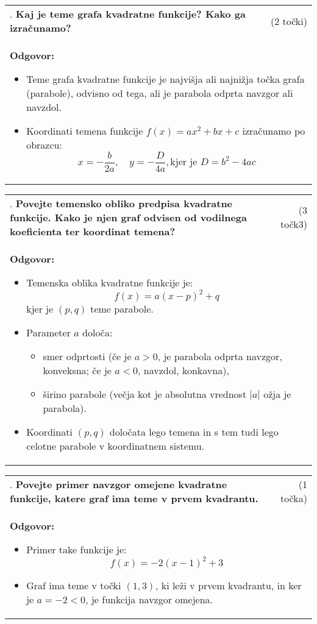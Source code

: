 \documentclass[12pt]{article}
\newcounter{vprasanje}[section]
\renewcommand{\thevprasanje}{\roman{vprasanje}}
\newcommand{\vprasanje}[2]{%
  \stepcounter{vprasanje}%
  \textbf{\thevprasanje}. \textbf{#1} & (#2) \\
}
\newcommand{\odgovor}[1]{%
  \multicolumn{2}{p{\dimexpr\textwidth-2\tabcolsep\relax}}{%
    \small \textbf{Odgovor:} #1%
  } \\[1em]%
}
\begin{document}
\begin{tabularx}{\textwidth}{X r}
\vprasanje{Kaj je teme grafa kvadratne funkcije? Kako ga izračunamo?}{2 točki}
\odgovor{
\begin{itemize}
  \item Teme grafa kvadratne funkcije je najvišja ali najnižja točka grafa (parabole), odvisno od tega, ali je parabola odprta navzgor ali navzdol.
  \item Koordinati temena funkcije $f(x) = ax^2 + bx + c$ izračunamo po obrazcu:
  \[
  x = -\frac{b}{2a}, \quad y = -\frac{D}{4a}, \text{kjer je } D  = b^2 -4ac
  \]
\end{itemize}
}
\end{tabularx}

\begin{tabularx}{\textwidth}{X r}
\vprasanje{Povejte temensko obliko predpisa kvadratne funkcije. Kako je njen graf odvisen od vodilnega koeficienta ter koordinat temena?}{3 točk3}
\odgovor{
\begin{itemize}
  \item Temenska oblika kvadratne funkcije je: 
  \[
  f(x) = a(x - p)^2 + q
  \]
  kjer je $(p, q)$ teme parabole.
  \item Parameter $a$ določa:
  \begin{itemize}
    \item smer odprtosti (če je $a > 0$, je parabola odprta navzgor, konveksna; če je $a < 0$, navzdol, konkavna),
    \item širino parabole (večja kot je absolutna vrednost $|a|$ ožja je parabola).
  \end{itemize}
  \item Koordinati $(p, q)$ določata lego temena in s tem tudi lego celotne parabole v koordinatnem sistemu.
\end{itemize}
}
\end{tabularx}

\begin{tabularx}{\textwidth}{X r}
\vprasanje{Povejte primer navzgor omejene kvadratne funkcije, katere graf ima teme v prvem kvadrantu.}{1 točka}
\odgovor{
\begin{itemize}
  \item Primer take funkcije je: 
  \[
  f(x) = -2(x - 1)^2 + 3
  \]
  \item Graf ima teme v točki $(1, 3)$, ki leži v prvem kvadrantu, in ker je $a = -2 < 0$, je funkcija navzgor omejena.
\end{itemize}
}
\end{tabularx}
\end{document}
